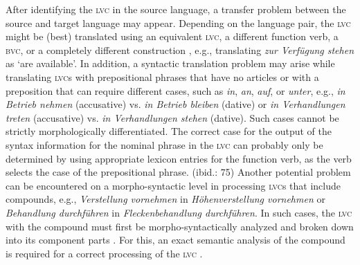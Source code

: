 \documentclass[output=paper]{langsci/langscibook}
\begin{document}
After identifying the \textsc{lvc} in the source language, a transfer problem between the source and target language may appear. Depending on the language pair, the \textsc{lvc} might be (best) translated using an equivalent \textsc{lvc}, a different function verb, a \textsc{bvc}, or a completely different construction \citep[96]{Bruker2013}, e.g., translating \textit{zur Verfügung stehen} as `are available'. In addition, a syntactic translation problem may arise while translating \textsc{lvc}s with prepositional phrases that have no articles or with a preposition that can require different cases, such as \textit{in}, \textit{an}, \textit{auf}, or \textit{unter}, e.g., \textit{in Betrieb nehmen} (accusative) vs. \textit{in Betrieb bleiben} (dative) or \textit{in Verhandlungen treten} (accusative) vs. \textit{in Verhandlungen stehen} (dative). Such cases cannot be strictly morphologically differentiated. The correct case for the output of the syntax information for the nominal phrase in the \textsc{lvc} can probably only be determined by using appropriate lexicon entries for the function verb, as the verb selects the case of the prepositional phrase. (ibid.: 75) Another potential problem can be encountered on a morpho-syntactic level in processing \textsc{lvc}s that include compounds, e.g., \textit{Verstellung vornehmen} in \textit{Höhenverstellung vornehmen} or \textit{Behandlung durchführen} in \textit{Fleckenbehandlung durchführen}. In such cases, the \textsc{lvc} with the compound must first be morpho-syntactically analyzed and broken down into its component parts \citep{Winhart2005}. For this, an exact semantic analysis of the compound is required for a correct processing of the \textsc{lvc} \citep[97]{Bruker2013}.
\end{document}
